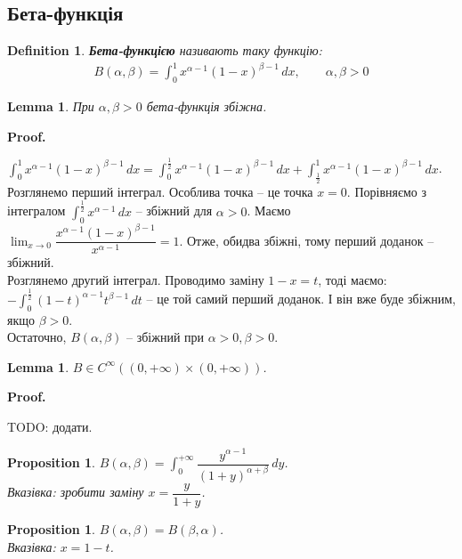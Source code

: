 \documentclass[a4paper, 10pt]{article}
\makeatletter
\def\huge{\displaystyle}
\def\qed{$\blacksquare$}
\theoremstyle{theoremdd}
\theoremstyle{theoremdd}
\theoremstyle{theoremdd}
\newtheorem{definition}[theorem]{Definition}
\theoremstyle{theoremdd}
\theoremstyle{theoremdd}
\theoremstyle{theoremdd}
\newtheorem{proposition}[theorem]{Proposition}
\theoremstyle{theoremdd}
\theoremstyle{theoremdd}
\newtheorem{lemma}[theorem]{Lemma}
\theoremstyle{theoremdd}
\renewenvironment{proof}[1][Proof.\\]{\par
\pushQED{\hfill \qed}%
\normalfont \topsep6\p@\@plus6\p@\relax
\trivlist
\item\relax
{\bfseries
#1\@addpunct{.}}\hspace\labelsep\ignorespaces
}{%
\popQED\endtrivlist\@endpefalse
}
\makeatother
\begin{document}
\subsection{Бета-функція}
\begin{definition}
\textbf{Бета-функцією} називають таку функцію:
\begin{align*}
B(\alpha,\beta) = \int_0^1 x^{\alpha-1} (1-x)^{\beta-1}\,dx,\qquad \alpha,\beta>0
\end{align*}
\end{definition}

\begin{lemma}
При $\alpha, \beta >0$ бета-функція збіжна.
\end{lemma}

\begin{proof}
$\huge \int_0^1 x^{\alpha-1} (1-x)^{\beta-1}\,dx = \int_0^{\frac{1}{2}} x^{\alpha-1} (1-x)^{\beta-1}\,dx +  \int_{\frac{1}{2}}^1 x^{\alpha-1} (1-x)^{\beta-1}\,dx$.\\
Розглянемо перший інтеграл. Особлива точка -- це точка $x =0$. Порівняємо з інтегралом $\huge \int_0^{\frac{1}{2}} x^{\alpha - 1} \,dx$ -- збіжний для $\alpha > 0$. Маємо\\
$\huge \lim_{x \to 0} \dfrac{x^{\alpha-1}(1-x)^{\beta-1}}{x^{\alpha-1}} = 1$. Отже, обидва збіжні, тому перший доданок -- збіжний.\\
Розглянемо другий інтеграл. Проводимо заміну $1-x=t$, тоді маємо:\\
$-\huge \int_{0}^{\frac{1}{2}} (1-t)^{\alpha-1} t^{\beta - 1}\,dt$ -- це той самий перший доданок. І він вже буде збіжним, якщо $\beta > 0$.\\
Остаточно, $B(\alpha, \beta)$ -- збіжний при $\alpha > 0,\beta > 0$.
\end{proof}

\begin{lemma}
$B \in C^{\infty}((0,+\infty) \times (0,+\infty))$.
\end{lemma}

\begin{proof}
TODO: додати.
\end{proof}

\begin{proposition}
$B(\alpha, \beta) = \huge \int_0^{+\infty} \dfrac{y^{\alpha-1}}{(1+y)^{\alpha+\beta}}\,dy$.\\
\textit{Вказівка: зробити заміну} $x = \dfrac{y}{1+y}$.
\end{proposition}

\begin{proposition}
$B(\alpha,\beta) = B(\beta,\alpha)$.\\
\textit{Вказівка: $x = 1-t$}.
\end{proposition}
\end{document}
